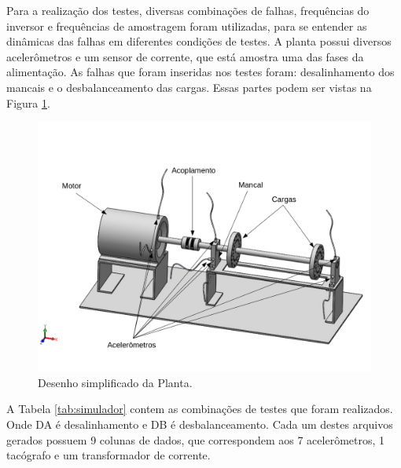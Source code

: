 Para a realização dos testes, diversas combinações de falhas, frequências do inversor e frequências de amostragem foram
utilizadas, para se entender as dinâmicas das falhas em diferentes condições de testes. A planta possui diversos acelerômetros e um sensor
de corrente, que está amostra uma das fases da alimentação. As falhas que foram inseridas nos testes foram: desalinhamento dos
mancais e o desbalanceamento das cargas. Essas partes podem ser vistas na Figura \ref{fig:lateral_desenho}.

\begin{figure}[H]
    \caption{Desenho simplificado da Planta.}
    \begin{center}
        \includegraphics[scale=.5]{metodologia/img/lateral_desenho.png}
    \end{center}
    \label{fig:lateral_desenho}
\end{figure}

A Tabela \ref{tab:simulador} contem as combinações de testes que foram realizados. Onde DA é desalinhamento e DB é desbalanceamento.
Cada um destes arquivos gerados possuem 9 colunas de dados, que correspondem aos 7 acelerômetros, 1 tacógrafo e um transformador de
corrente.

